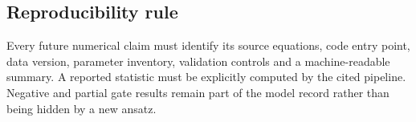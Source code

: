 \subsection{Reproducibility rule}

Every future numerical claim must identify its source equations, code entry
point, data version, parameter inventory, validation controls and a
machine-readable summary.  A reported statistic must be explicitly computed
by the cited pipeline.  Negative and partial gate results remain part of the
model record rather than being hidden by a new ansatz.
